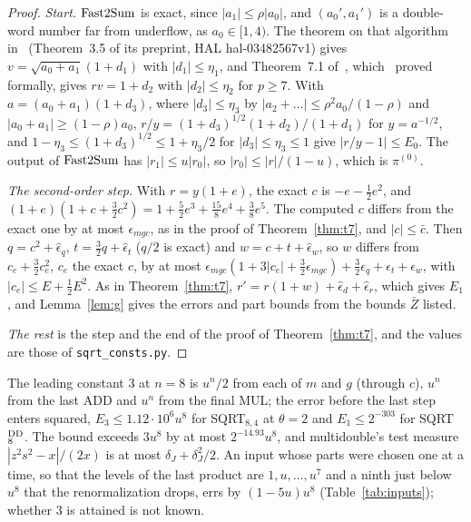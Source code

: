 \begin{proof}
\emph{Start.} $\mathrm{Fast2Sum}$ is exact, since $|a_1| \le \rho|a_0|$, and $(a_0', a_1')$ is a double-word number far from
underflow, as $a_0 \in [1, 4)$. The theorem on that algorithm in~\cite{LLMPR23} (Theorem~3.5 of its preprint, HAL hal-03482567v1) gives $v = \sqrt{a_0 + a_1}(1 + d_1)$ with $|d_1| \le
\eta_1$, and Theorem~7.1 of~\cite{JMP17}, which~\cite{MR22} proved formally, gives $r v = 1 + d_2$ with $|d_2| \le
\eta_2$ for $p \ge 7$. With $a = (a_0 + a_1)(1 + d_3)$, where $|d_3| \le \eta_3$ by $|a_2 + \dots| \le
\rho^2a_0/(1-\rho)$ and $|a_0 + a_1| \ge (1-\rho)a_0$, $r/y = (1+d_3)^{1/2}(1+d_2)/(1+d_1)$ for $y = a^{-1/2}$,
and $1 - \eta_3 \le (1+d_3)^{1/2} \le 1 + \eta_3/2$ for $|d_3| \le \eta_3 \le 1$ give $|r/y - 1| \le E_0$. The output of $\mathrm{Fast2Sum}$ has $|r_1| \le u|r_0|$, so $|r_0| \le |r|/(1-u)$,
which is $\pi^{(0)}$.

\emph{The second-order step.} With $r = y(1+e)$, the exact $c$ is $-e - \frac12e^2$, and $(1+e)(1 + c + \frac32c^2) = 1 +
\frac52e^3 + \frac{15}8e^4 + \frac38e^5$. The computed $c$ differs from the exact one by at most $\epsilon_{mgc}$, as in the
proof of Theorem~\ref{thm:t7}, and $|c| \le \bar c$. Then $q = c^2 + \hat\epsilon_q$, $t = \frac32q + \hat\epsilon_t$
($q/2$ is exact) and $w = c + t + \hat\epsilon_w$, so $w$ differs from $c_e + \frac32c_e^2$, $c_e$ the exact $c$, by at
most $\epsilon_{mgc}(1 + 3|c_e| + \frac32\epsilon_{mgc}) + \frac32\epsilon_q + \epsilon_t + \epsilon_w$, with $|c_e| \le E + \frac12E^2$.
As in Theorem~\ref{thm:t7}, $r' = r(1 + w) + \hat\epsilon_d + \hat\epsilon_r$, which gives $E_1$, and Lemma~\ref{lem:g}
gives the errors and part bounds from the bounds $\bar Z$ listed.

\emph{The rest} is the step and the end of the proof of Theorem~\ref{thm:t7}, and the values are those of
\texttt{sqrt\_consts.py}.
\end{proof}

\begin{remark}
The leading constant 3 at $n = 8$ is $u^n/2$ from each of $m$ and $g$ (through $c$), $u^n$ from the last ADD and $u^n$
from the final MUL; the error before the last step enters squared, $E_3 \le 1.12 \cdot 10^6u^8$ for SQRT$_{8,4}$ at
$\theta = 2$ and $E_1 \le 2^{-303}$ for SQRT$^{\rm DD}_8$. The bound exceeds $3u^8$ by at most $2^{-14.93}u^8$, and multidouble's test measure $|z^2s^2 - x|/(2x)$
is at most $\delta_J + \delta_J^2/2$. An input whose parts were chosen one at a time, so that the levels of the last
product are $1, u, \dots, u^7$ and a ninth just below $u^8$ that the renormalization drops, errs by $(1 - 5u)u^8$
(Table~\ref{tab:inputs}); whether 3 is attained is not known.
\end{remark}

